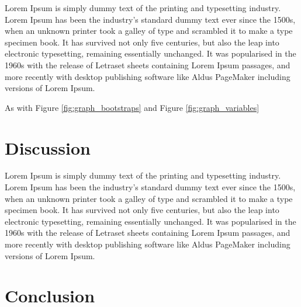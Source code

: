 \documentclass[12pt]{article}
\begin{document}
Lorem Ipsum is simply dummy text of the printing and typesetting industry. Lorem Ipsum has been the industry's standard dummy text ever since the 1500s, when an unknown printer took a galley of type and scrambled it to make a type specimen book. It has survived not only five centuries, but also the leap into electronic typesetting, remaining essentially unchanged. It was popularised in the 1960s with the release of Letraset sheets containing Lorem Ipsum passages, and more recently with desktop publishing software like Aldus PageMaker including versions of Lorem Ipsum.

As with Figure \ref{fig:graph_bootstraps} and Figure \ref{fig:graph_variables}

\section{Discussion}

Lorem Ipsum is simply dummy text of the printing and typesetting industry. Lorem Ipsum has been the industry's standard dummy text ever since the 1500s, when an unknown printer took a galley of type and scrambled it to make a type specimen book. It has survived not only five centuries, but also the leap into electronic typesetting, remaining essentially unchanged. It was popularised in the 1960s with the release of Letraset sheets containing Lorem Ipsum passages, and more recently with desktop publishing software like Aldus PageMaker including versions of Lorem Ipsum.


\section{Conclusion}

\newpage


\end{document}
